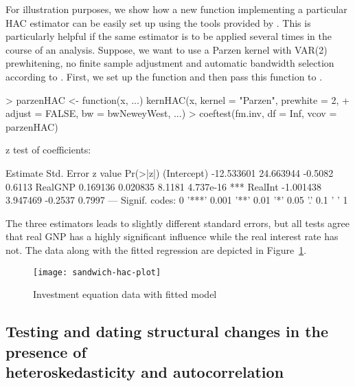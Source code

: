 \documentclass{Z}
\begin{document}
For illustration purposes, we show how a new function implementing a particular
HAC estimator can be easily set up using the tools provided by .
This is particularly helpful if the same estimator is to be applied several times
in the course of an analysis. Suppose, we want to use a Parzen kernel with VAR(2)
prewhitening, no finite sample adjustment and automatic bandwidth selection
according to \cite{hac:Newey+West:1994}. First, we set
up the function  and then pass this function to . 
\begin{Schunk}
\begin{Sinput}
> parzenHAC <- function(x, ...) kernHAC(x, kernel = "Parzen", prewhite = 2, 
+     adjust = FALSE, bw = bwNeweyWest, ...)
> coeftest(fm.inv, df = Inf, vcov = parzenHAC)
\end{Sinput}
\begin{Soutput}
z test of coefficients:

              Estimate Std. Error z value  Pr(>|z|)    
(Intercept) -12.533601  24.663944 -0.5082    0.6113    
RealGNP       0.169136   0.020835  8.1181 4.737e-16 ***
RealInt      -1.001438   3.947469 -0.2537    0.7997    
---
Signif. codes:  0 '***' 0.001 '**' 0.01 '*' 0.05 '.' 0.1 ' ' 1 
\end{Soutput}
\end{Schunk}
The three estimators leads to slightly different standard errors, but all
tests agree that real GNP has a highly significant influence while
the real interest rate has not. The data along with the fitted regression
are depicted in Figure~\ref{fig:hac}.

\begin{figure}[tbh]
\begin{center}
\texttt{[image: sandwich-hac-plot]}
\caption{\label{fig:hac} Investment equation data with fitted model}
\end{center}
\end{figure}

\subsection[Testing and dating structural changes in the presence of heteroskedasticity and autocorrelation]{Testing and dating structural changes in the presence of\\ heteroskedasticity and autocorrelation}
\end{document}
